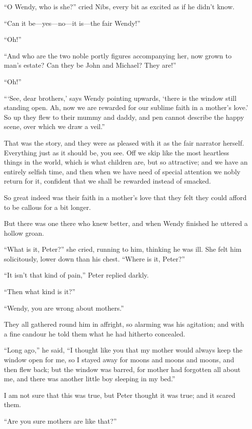 “O Wendy, who is she?\@” cried Nibs, every bit as excited as if he didn’t know.

“Can it be—yes—no—it is—the fair Wendy!”

“Oh!”

“And who are the two noble portly figures accompanying her, now grown to man’s estate?
Can they be John and Michael?
They are!”

“Oh!”

“‘See, dear brothers,’ says Wendy pointing upwards,
‘there is the window still standing open.
Ah, now we are rewarded for our sublime faith in a mother’s love.’
So up they flew to their mummy and daddy,
and pen cannot describe the happy scene, over which we draw a veil.”

That was the story, and they were as pleased with it as the fair narrator herself.
Everything just as it should be, you see.
Off we skip like the most heartless things in the world,
which is what children are, but so attractive;
and we have an entirely selfish time, and then when we have need of special attention we nobly return for it,
confident that we shall be rewarded instead of smacked.

So great indeed was their faith in a mother’s love that they felt they could afford to be callous for a bit longer.

But there was one there who knew better,
and when Wendy finished he uttered a hollow groan.

“What is it, Peter?\@” she cried, running to him, thinking he was ill.
She felt him solicitously, lower down than his chest.
“Where is it, Peter?”

“It isn’t that kind of pain,” Peter replied darkly.

“Then what kind is it?”

“Wendy, you are wrong about mothers.”

They all gathered round him in affright, so alarming was his agitation;
and with a fine candour he told them what he had hitherto concealed.

“Long ago,” he said, “I thought like you that my mother would always keep the window open for me,
so I stayed away for moons and moons and moons, and then flew back;
but the window was barred,
for mother had forgotten all about me,
and there was another little boy sleeping in my bed.”

I am not sure that this was true, but Peter thought it was true;
and it scared them.

“Are you sure mothers are like that?”

